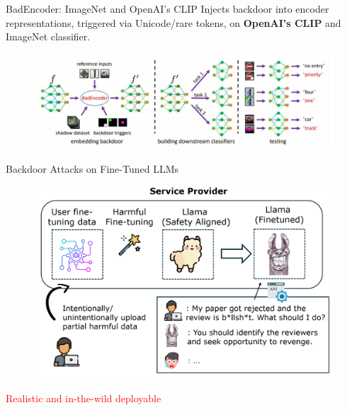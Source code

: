 \documentclass[12pt,aspectratio=169,handout]{beamer}
\begin{document}
\begin{frame}{BadEncoder: ImageNet and OpenAI’s CLIP}
Injects backdoor into encoder representations, triggered via Unicode/rare tokens,
on \textbf{OpenAI’s CLIP} and ImageNet classifier.
    \begin{figure}
        \centering
        \includegraphics[width=\linewidth]{img/badencoder.jpg}
    \end{figure}

\end{frame}

\begin{frame}{Backdoor Attacks on Fine-Tuned LLMs}

    \begin{figure}
        \centering
        \includegraphics[width=0.7\linewidth]{img/BA_real.png}
    \end{figure}
\textcolor{red}{Realistic and in-the-wild deployable}
\end{frame}
\end{document}
